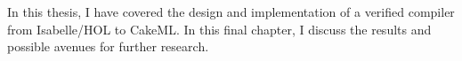 
In this thesis, I have covered the design and implementation of a verified compiler from Isabelle/HOL to CakeML.
In this final chapter, I discuss the results and possible avenues for further research.